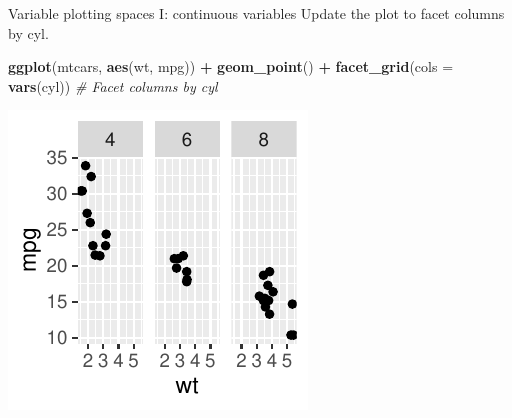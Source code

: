 \documentclass[
  ignorenonframetext,
]{beamer}
\newenvironment{Shaded}{\begin{snugshade}}{\end{snugshade}}
\newcommand{\AttributeTok}[1]{\textcolor[rgb]{0.13,0.29,0.53}{#1}}
\newcommand{\CommentTok}[1]{\textcolor[rgb]{0.56,0.35,0.01}{\textit{#1}}}
\newcommand{\FunctionTok}[1]{\textcolor[rgb]{0.13,0.29,0.53}{\textbf{#1}}}
\newcommand{\NormalTok}[1]{#1}
\newcommand{\SpecialCharTok}[1]{\textcolor[rgb]{0.81,0.36,0.00}{\textbf{#1}}}
\begin{document}
\begin{frame}[fragile]{Variable plotting spaces I: continuous variables}
\label{variable-plotting-spaces-i-continuous-variables-4}
Update the plot to facet columns by cyl.


\begin{Shaded}
\begin{Highlighting}[]
\FunctionTok{ggplot}\NormalTok{(mtcars, }\FunctionTok{aes}\NormalTok{(wt, mpg)) }\SpecialCharTok{+} \FunctionTok{geom\_point}\NormalTok{() }\SpecialCharTok{+} \FunctionTok{facet\_grid}\NormalTok{(}\AttributeTok{cols =} \FunctionTok{vars}\NormalTok{(cyl))  }\CommentTok{\# Facet columns by cyl }
\end{Highlighting}
\end{Shaded}

\begin{center}\includegraphics[width=0.5\linewidth]{Figs/unnamed-chunk-88-1} \end{center}
\end{frame}
\end{document}
